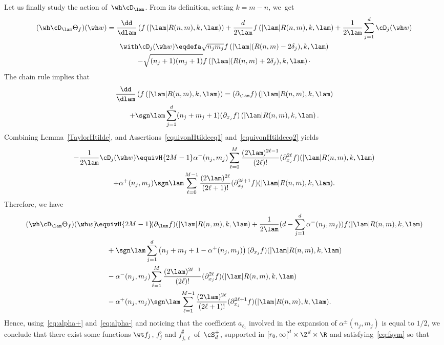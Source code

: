 Let us finally study the action of~$\wh\cD_\lam$. {}From its definition, setting $k=m-n$, we~get
\begin{multline*}
(\wh\cD_\lam \Theta_f)(\wh w) = \frac {\dd} {\dlam}\left(f \left(|\lam|R(n,m),k,\lam\right)\right) + \frac d {2\lam} f \left(|\lam|R(n,m),k,\lam\right) +\frac 1{2 \lam}\sum_{j=1}^d \cD_j(\wh w)\hfill\\ \with
\cD_j(\wh w)\eqdefa
\sqrt {n_jm_j} f \left(|\lam| (R(n,m)-2\delta_j),k,\lam\right) \\  -\sqrt {(n_j+1)(m_j+1)} f \left(|\lam| (R(n,m)+2\delta_j),k,\lam\right)\cdotp
\end{multline*}
The chain rule implies that
\begin{multline*}
\frac {\dd} {\dlam}\left(f \left(|\lam|R(n,m),k,\lam\right)\right) =(\partial_\lam f)\left(|\lam|R(n,m),k,\lam\right)\\
+\sgn\lam \sum_{j=1} ^d (n_j+m_j+1)(\partial_{x_j} f)\left(|\lam|R(n,m),k, \lam\right).
\end{multline*}
Combining Lemma~\ref{TaylorHtilde}, and Assertions~\eqref{equivonHtildeeq1} and~\eqref{equivonHtildeeq2} yields
\begin{multline*}
-\frac 1 {2\lam} \cD _j(\wh w) \equivH {2M-1} \alpha^-(n_j,m_j)
\sum_{\ell=0}^M \frac { (2\lam)^{2\ell-1 }} {(2\ell)!} (\partial_{x_j}^{2\ell} f)(|\lam|R(n,m),k,\lam)\\  +{\alpha^+(n_j,m_j)}\sgn\lam\sum_{\ell=0} ^{M-1}\frac {(2\lam)^{2\ell}}{(2\ell+1)!} (\partial^{2\ell+1}_{x_j} f)(|\lam|R(n,m),k,\lam).
\end{multline*}
Therefore, we have
\begin{multline*}
(\wh\cD_\lam \Theta_f)(\wh w) \!\equivH {2M-1}\! (\partial_\lam f)(|\lam|R(n,m),k,\lam) +\frac{1}{2\lam} (d-\sum_{j=1}^d\alpha^-(n_j,m_j)) f (|\lam|R(n,m),k,\lam)\\
\begin{aligned}
&+\sgn\lam \sum_{j=1} ^d \left(n_j+m_j+1 - \alpha^+(n_j,m_j)\right)(\partial_{x_j} f)(|\lam|R(n,m),k, \lam)\\
&- \alpha^-(n_j,m_j)
\sum_{\ell=1}^M \frac { (2\lam)^{2\ell-1 }} {(2\ell)!} (\partial_{x_j}^{2\ell} f)(|\lam|R(n,m),k,\lam)\\
&-{\alpha^+(n_j,m_j)}\sgn\lam\sum_{\ell=1} ^{M-1}\frac {(2\lam)^{2\ell}}{(2\ell+1)!} (\partial^{2\ell+1}_{x_j} f)(|\lam|R(n,m),k,\lam).
\end{aligned}
\end{multline*}
Hence, using~\eqref{eq:alpha+} and~\eqref{eq:alpha-} and noticing that the coefficient $a_{\ell_1}$ involved in the expansion of $ \alpha^\pm (n_j,m_j)$ is equal to $1/2$, we conclude that there exist some functions $\wt f_j$, $f^\flat _j$ and $f^\sharp _{j,\ell}$ of~$\cS_d^+$, supported in $[r_0,\infty\mathclose{[}^d\times\Z^d\times\R$ and satisfying~\eqref{eq:fsym} so that
